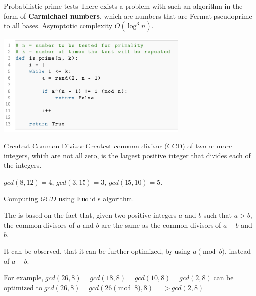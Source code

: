 \documentclass{beamer}
\begin{document}
    \begin{frame}{Probabilistic prime tests}
        There exists a problem with such an algorithm in the form of \textbf{Carmichael numbers}, which are numbers that are Fermat pseudoprime to all bases.
        Asymptotic complexity $O(\log^3{n})$.

        \includegraphics[width=0.7\textwidth]{images/lecture_2/prime-test-prob.png}
    \end{frame}


    \begin{frame}{Greatest Common Divisor}
        Greatest common divisor (GCD) of two or more integers, which are not all zero, is the largest positive integer that divides each of the integers. 

        \begin{example}
            $gcd(8, 12) = 4$, 
            $gcd(3, 15) = 3$, 
            $gcd(15, 10) = 5$.
        \end{example}

    \end{frame}

    \begin{frame}{Computing $GCD$ using Euclid's algorithm. }
        
The is based on the fact that, given two positive integers $a$ and $b$ such that $a > b$, 
the common divisors of $a$ and $b$ are the same as the common divisors of $a - b$ and $b$. 

It can be observed, that it can be further optimized, by using $a \pmod{b}$, instead of $a - b$. 

For example, $gcd(26, 8) = gcd(18, 8) = gcd(10, 8) = gcd(2, 8)$ can be optimized to $gcd(26, 8) = gcd(26 \pmod{8}, 8) => gcd(2, 8)$


    \end{frame}
\end{document}
